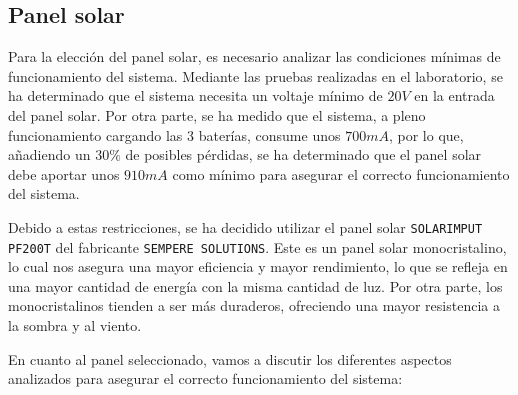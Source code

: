 \subsection{Panel solar}\label{subsec:panel_solar}
Para la elección del panel solar, es necesario analizar las condiciones mínimas de funcionamiento del sistema. Mediante las pruebas realizadas en el laboratorio, se ha determinado que el sistema necesita un voltaje mínimo de $20 V$ en la entrada del panel solar. Por otra parte, se ha medido que el sistema, a pleno funcionamiento cargando las 3 baterías, consume unos $700 mA$, por lo que, añadiendo un $30\%$ de posibles pérdidas, se ha determinado que el panel solar debe aportar unos $910 mA$ como mínimo para asegurar el correcto funcionamiento del sistema.

Debido a estas restricciones, se ha decidido utilizar el panel solar \texttt{SOLARIMPUT PF200T} del fabricante \texttt{SEMPERE SOLUTIONS}. Este es un panel solar monocristalino, lo cual nos asegura una mayor eficiencia y mayor rendimiento, lo que se refleja en una mayor cantidad de energía con la misma cantidad de luz. Por otra parte, los monocristalinos tienden a ser más duraderos, ofreciendo una mayor resistencia a la sombra y al viento. \cite{autosolarDiferenciasEntreSilicio} 

En cuanto al panel seleccionado, vamos a discutir los diferentes aspectos analizados para asegurar el correcto funcionamiento del sistema:

